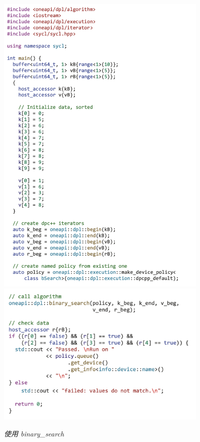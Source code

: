 \begin{figure}[H]
	\centering
	\includegraphics[width=0.9\textwidth]{figs/F18.8-1.png}
	\includegraphics[width=0.9\textwidth]{figs/F18.8-2.png}
	\caption{\textit{使用 binary\_search }}
\end{figure}

